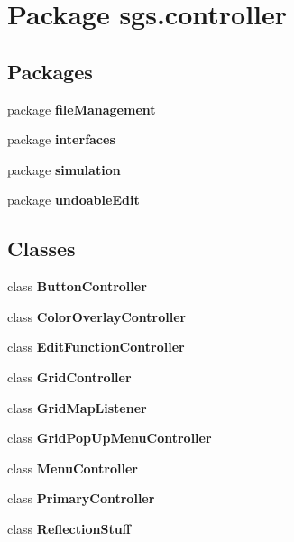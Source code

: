 \section{Package sgs.\-controller}
\label{namespacesgs_1_1controller}
\subsection*{Packages}
\begin{DoxyCompactItemize}
\item 
package {\bf file\-Management}
\item 
package {\bf interfaces}
\item 
package {\bf simulation}
\item 
package {\bf undoable\-Edit}
\end{DoxyCompactItemize}
\subsection*{Classes}
\begin{DoxyCompactItemize}
\item 
class {\bf Button\-Controller}
\item 
class {\bf Color\-Overlay\-Controller}
\item 
class {\bf Edit\-Function\-Controller}
\item 
class {\bf Grid\-Controller}
\item 
class {\bf Grid\-Map\-Listener}
\item 
class {\bf Grid\-Pop\-Up\-Menu\-Controller}
\item 
class {\bf Menu\-Controller}
\item 
class {\bf Primary\-Controller}
\item 
class {\bf Reflection\-Stuff}
\end{DoxyCompactItemize}
